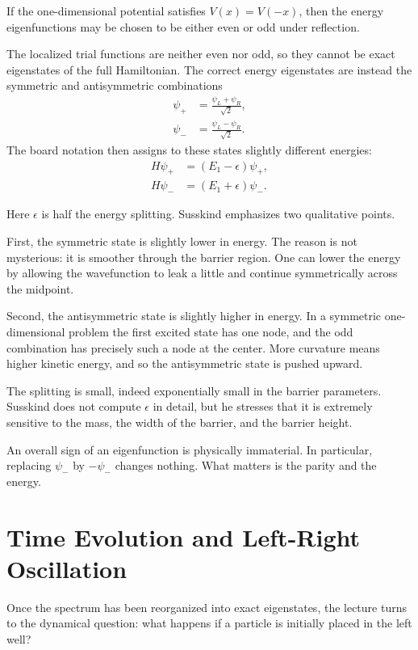 \begin{theorem}
If the one-dimensional potential satisfies \(V(x)=V(-x)\), then the energy eigenfunctions may be chosen to be either even or odd under reflection.
\end{theorem}

The localized trial functions are neither even nor odd, so they cannot be exact eigenstates of the full Hamiltonian. The correct energy eigenstates are instead the symmetric and antisymmetric combinations
\begin{align}
\psi_+ &= \frac{\psi_L+\psi_R}{\sqrt{2}},\\
\psi_- &= \frac{\psi_L-\psi_R}{\sqrt{2}}.
\end{align}
The board notation then assigns to these states slightly different energies:
\begin{align}
H\psi_+ &= (E_1-\epsilon)\psi_+,\\
H\psi_- &= (E_1+\epsilon)\psi_-.
\end{align}

Here \(\epsilon\) is half the energy splitting. Susskind emphasizes two qualitative points.

First, the symmetric state is slightly lower in energy. The reason is not mysterious: it is smoother through the barrier region. One can lower the energy by allowing the wavefunction to leak a little and continue symmetrically across the midpoint.

Second, the antisymmetric state is slightly higher in energy. In a symmetric one-dimensional problem the first excited state has one node, and the odd combination has precisely such a node at the center. More curvature means higher kinetic energy, and so the antisymmetric state is pushed upward.

The splitting is small, indeed exponentially small in the barrier parameters. Susskind does not compute \(\epsilon\) in detail, but he stresses that it is extremely sensitive to the mass, the width of the barrier, and the barrier height.

An overall sign of an eigenfunction is physically immaterial. In particular, replacing \(\psi_-\) by \(-\psi_-\) changes nothing. What matters is the parity and the energy.

\section{Time Evolution and Left-Right Oscillation}

Once the spectrum has been reorganized into exact eigenstates, the lecture turns to the dynamical question: what happens if a particle is initially placed in the left well?

